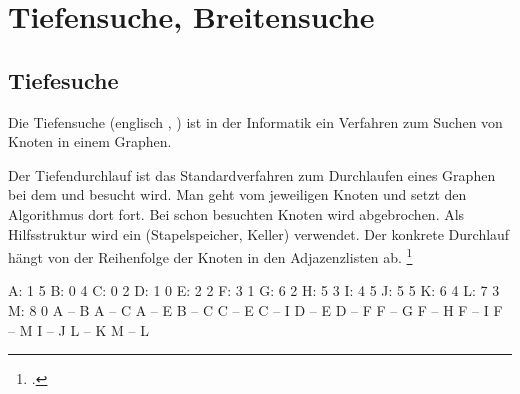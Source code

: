 \documentclass{lehramt-informatik-haupt}
\begin{document}

\chapter{Tiefensuche, Breitensuche}

\section{Tiefesuche}

\begin{liQuellen}
\item \cite[Seite 39-52 (PDF 32-45)]{aud:fs:6}
\item \cite{wiki:tiefensuche}
\item \cite[Kapitel 6.2.2.2 Graphalgorithmen, Seite 185]{schneider}
\end{liQuellen}

Die Tiefensuche (englisch , ) ist
in der Informatik ein Verfahren zum Suchen von Knoten in einem Graphen.

Der Tiefendurchlauf ist das Standardverfahren zum Durchlaufen eines
Graphen bei dem  und  besucht wird. Man geht vom jeweiligen Knoten
 und setzt den
Algorithmus dort  fort. Bei schon besuchten Knoten wird
abgebrochen. Als Hilfsstruktur wird ein  (Stapelspeicher,
Keller) verwendet. Der konkrete Durchlauf hängt von der Reihenfolge der
Knoten in den Adjazenzlisten ab.
\footcite[Seite 40 (PDF 33)]{aud:fs:6}

\begin{liGraphenFormat}
A: 1 5
B: 0 4
C: 0 2
D: 1 0
E: 2 2
F: 3 1
G: 6 2
H: 5 3
I: 4 5
J: 5 5
K: 6 4
L: 7 3
M: 8 0
A -- B
A -- C
A -- E
B -- C
C -- E
C -- I
D -- E
D -- F
F -- G
F -- H
F -- I
F -- M
I -- J
L -- K
M -- L
\end{liGraphenFormat}

\end{document}
